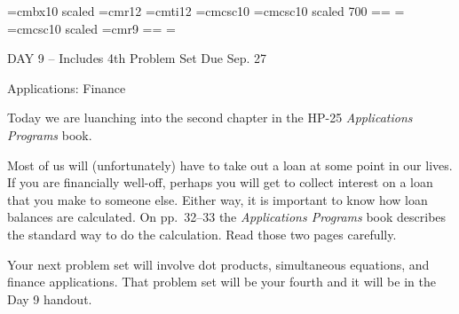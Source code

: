 
\def\folio{\ifnum\pageno>0 \number\pageno \else
   \ifnum\pageno<0 \romannumeral-\pageno \else\fi\fi}

\font\largebf=cmbx10  scaled 
\font\largerm=cmr12
\font\largeit=cmti12
\font\tensc=cmcsc10
\font\sevensc=cmcsc10 scaled 700
\newfam\scfam \def\sc{\fam\scfam\tensc}
\textfont\scfam=\tensc \scriptfont\scfam=\sevensc
\scriptscriptfont\scfam=\sevensc
\font\largesc=cmcsc10 scaled 
\font\ninerm=cmr9
\newfam\srfam \def\sr{\fam\srfam\ninerm}
\textfont\srfam=\ninerm \scriptfont\srfam=\sevenrm
\scriptscriptfont\srfam=\fiverm




\null\vskip36pt

\centerline{\largerm DAY 9 -- Includes 4th Problem Set Due Sep. 27}
\nobreak\bigskip

\centerline{\largeit Applications: Finance}
\nobreak\bigskip

\nobreak\bigskip

\noindent Today we are luanching into the second chapter in the HP-25 {\it Applications Programs} book.

\bigskip

\nobreak\bigskip

\noindent Most of us will (unfortunately) have to take out a loan at some point in our lives. If you are financially well-off, perhaps you will get to collect interest on a loan that you make to someone else. Either way, it is important to know how loan balances are calculated. On pp.~32--33 the {\it Applications Programs} book describes the standard way to do the calculation. Read those two pages carefully.

\bigskip

\bigskip

\nobreak\bigskip

\noindent Your next problem set will involve dot products, simultaneous equations, and finance applications. That problem set will be your fourth and it will be in the Day 9 handout.

\bigskip

\bye
